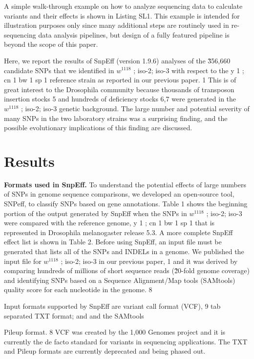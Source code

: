 A simple walk-through example on how to analyze sequencing data to calculate variants and their effects is shown in Listing SL1. This example is intended for illustration purposes only since many additional steps are routinely used in re-sequencing data analysis pipelines, but design of a fully featured pipeline is beyond the scope of this paper.

Here, we report the results of SnpEff (version 1.9.6) analyses of the \~356,660 candidate SNPs that we identified in $w^{1118}$ ; iso-2; iso-3 with respect to the y 1 ; cn 1 bw 1 sp 1 reference strain as reported in our previous paper. 1 This is of great interest to the Drosophila community because thousands of transposon insertion stocks 5 and hundreds of deficiency stocks 6,7 were generated in the $w^{1118}$ ; iso-2; iso-3 genetic background. The large number and potential severity of many SNPs in the two laboratory strains was a surprising finding, and the possible evolutionary implications of this finding are discussed.

\section{Results}

\textbf{Formats used in SnpEff.} To understand the potential effects of large numbers of SNPs in genome sequence comparisons, we developed an open-source tool, SNPeff, to classify SNPs based on gene annotations. Table 1 shows the beginning portion of the output generated by SnpEff when the SNPs in $w^{1118}$ ; iso-2; iso-3 were compared with the reference genome, y 1 ; cn 1 bw 1 sp 1 that is represented in Drosophila melanogaster release 5.3. A more complete SnpEff effect list is shown in Table 2. Before using SnpEff, an input file must be generated that lists all of the SNPs and INDELs in a genome. We published the input file for $w^{1118}$ ; iso-2; iso-3 in our previous paper, 1 and it was derived by comparing hundreds of millions of short sequence reads (\~20-fold genome coverage) and identifying SNPs based on a Sequence Alignment/Map tools (SAMtools) quality score for each nucleotide in the genome. 8

Input formats supported by SnpEff are variant call format (VCF), 9 tab separated TXT format; and and the SAMtools

Pileup format. 8 VCF was created by the 1,000 Genomes project and it is currently the de facto standard for variants in sequencing applications. The TXT and Pileup formats are currently deprecated and being phased out.

